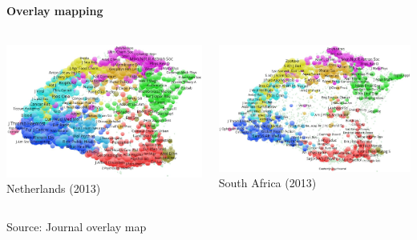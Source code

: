 \documentclass[8pt]{beamer}
\begin{document}
\begin{frame}
\frametitle{\insertsection}
\framesubtitle{Overlay mapping}


\begin{columns}

\centering
\includegraphics[width=\linewidth,height=0.50\textheight,keepaspectratio]{journals_NL}\\
\tiny{Netherlands (2013)}

\centering 
\includegraphics[width=\linewidth,height=0.50\textheight,keepaspectratio]{journals_SA}\\
\tiny{South Africa (2013)}

\end{columns}

\centering
\tiny{Source: Journal overlay map \cite{Leydesdorff2016}}
	
\end{frame}
\end{document}
